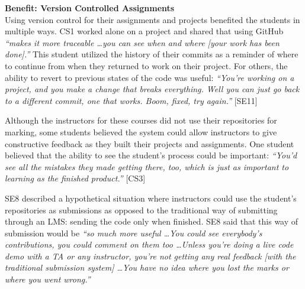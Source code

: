 





\textbf{Benefit: Version Controlled Assignments} \\
Using version control for their assignments and projects benefited the students in multiple ways. CS1 worked alone on a project and shared that using GitHub \textit{``makes it more traceable \ldots you can see when and where [your work has been done].''} This student utilized the history of their commits as a reminder of where to continue from when they returned to work on their project. For others, the ability to revert to previous states of the code was useful: \textit{``You're working on a project, and you make a change that breaks everything. Well you can just go back to a different commit, one that works. Boom, fixed, try again.''} [SE11]

Although the instructors for these courses did not use their repositories for marking, some students believed the system could allow instructors to give constructive feedback as they built their projects and assignments. One student believed that the ability to see the student's process could be important: \textit{``You'd see all the mistakes they made getting there, too, which is just as important to learning as the finished product.''} [CS3]

SE8 described a hypothetical situation where instructors could use the student's repositories as submissions as opposed to the traditional way of submitting through an LMS: sending the code only when finished. SE8 said that this way of submission would be \textit{``so much more useful \ldots You could see everybody's contributions, you could comment on them too \ldots Unless you're doing a live code demo with a TA or any instructor, you're not getting any real feedback [with the traditional submission system] \ldots You have no idea where you lost the marks or where you went wrong.''}

